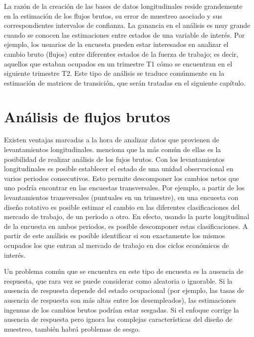 \documentclass[
  12pt,
]{book}
\begin{document}
La razón de la creación de las bases de datos longitudinales reside grandemente en la estimación de los flujos brutos, su error de muestreo asociado y sus correspondientes intervalos de confianza. La ganancia en el análisis es muy grande cuando se conocen las estimaciones entre estados de una variable de interés. Por ejemplo, los usuarios de la encuesta pueden estar interesados en analizar el cambio bruto (flujos) entre diferentes estados de la fuerza de trabajo; es decir, aquellos que estaban ocupados en un trimestre T1 cómo se encuentran en el siguiente trimestre T2. Este tipo de análisis se traduce comúnmente en la estimación de matrices de transición, que serán tratadas en el siguiente capítulo.

\hypertarget{anuxe1lisis-de-flujos-brutos}{%
\chapter{Análisis de flujos brutos}\label{anuxe1lisis-de-flujos-brutos}}

Existen ventajas marcadas a la hora de analizar datos que provienen de levantamientos longitudinales. \citet{Lynn_2009} menciona que la más común de ellas es la posibilidad de realizar análisis de los fujos brutos. Con los levantamientos longitudinales es posible establecer el estado de una unidad observacional en varios periodos consecutivos. Esto permite descomponer los cambios netos que uno podría encontrar en las encuestas transversales. Por ejemplo, a partir de los levantamientos transversales (puntuales en un trimestre), en una encuesta con diseño rotativo es posible estimar el cambio en las diferentes clasificaciones del mercado de trabajo, de un periodo a otro. En efecto, usando la parte longitudinal de la encuesta en ambos periodos, es posible descomponer estas clasificaciones. A partir de este análisis es posible identificar si son exactamente los mismos ocupados los que entran al mercado de trabajo en dos ciclos económicos de interés.

Un problema común que se encuentra en este tipo de encuesta es la ausencia de respuesta, que rara vez se puede considerar como aleatoria o ignorable. Si la ausencia de respuesta depende del estado ocupacional (por ejemplo, las tasas de ausencia de respuesta son más altas entre los desempleados), las estimaciones ingenuas de los cambios brutos podrían estar sesgadas. Si el enfoque corrige la ausencia de respuesta pero ignora las complejas características del diseño de muestreo, también habrá problemas de sesgo.
\end{document}
